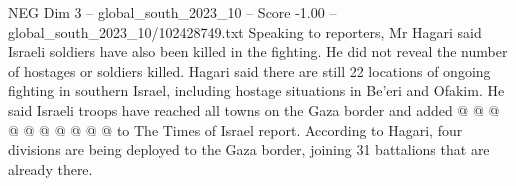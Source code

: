 \begin{textsample}{NEG Dim 3 – global\_south\_2023\_10 – Score -1.00 – global\_south\_2023\_10/102428749.txt}
Speaking to reporters, Mr Hagari said Israeli soldiers have also been killed in the fighting.
He did not reveal the number of hostages or soldiers killed.
Hagari said there are still 22 locations of ongoing fighting in southern Israel, including hostage situations in Be'eri and Ofakim.
He said Israeli troops have reached all towns on the Gaza border and added @ @ @ @ @ @ @ @ @ @ to The Times of Israel report.
According to Hagari, four divisions are being deployed to the Gaza border, joining 31 battalions that are already there.

\end{textsample}
